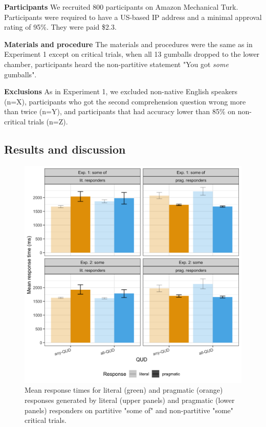\documentclass[10pt,letterpaper]{article}
\begin{document}
\noindent \textbf{Participants} We recruited 800 participants on Amazon Mechanical Turk. Participants were required to have a US-based IP address and a minimal approval rating of 95\%. They were paid \$2.3.

\noindent \textbf{Materials and procedure} The materials and procedures were the same as in Experiment 1 except on critical trials, when all 13 gumballs dropped to the lower chamber, participants heard the non-partitive statement "You got \textit{some} gumballs".

\noindent \textbf{Exclusions} As in Experiment 1, we excluded non-native English speakers (n=X), participants who got the second comprehension question wrong more than twice (n=Y), and participants that had accuracy lower than 85\% on non-critical trials (n=Z).


\subsection{Results and discussion}

\begin{figure}
  \includegraphics[width=\columnwidth]{plots/responsetimes.png}
  \caption{Mean response times for literal (green) and pragmatic (orange) responses generated by literal (upper panels) and pragmatic (lower panels) responders on partitive "some of" and non-partitive "some" critical trials. \label{fig:responsetimes}}
\end{figure}
\end{document}

